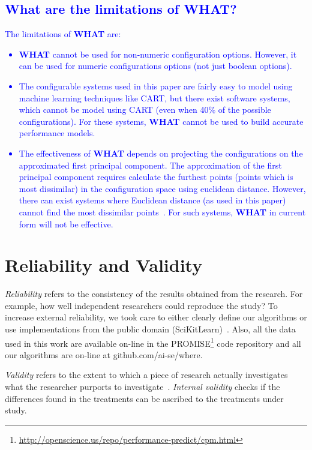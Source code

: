 \documentclass[smallextended]{svjour3}       %
\newcommand{\what}{{\bf WHAT}\xspace}
\begin{document}
\subsection{\textcolor{blue}{What are the limitations of WHAT?}}
\textcolor{blue}{
The limitations of \what{} are:
\begin{itemize}
    \item \what{} cannot be used for non-numeric configuration options. However, it can be used for numeric configurations options (not just boolean options). 
    \item The configurable systems used in this paper are fairly easy to model using machine learning techniques like CART, but there exist software systems, which cannot be model using CART (even when 40\% of the possible configurations). For these systems, \what{} cannot be used to build accurate performance models.
    \item The effectiveness of \what{} depends on projecting the configurations on the approximated first principal component. The approximation of the first principal component requires calculate the furthest points (points which is most dissimilar)  in the configuration space using euclidean distance. However, there can exist systems where  Euclidean distance (as used in this paper) cannot  find the most dissimilar points~\cite{chen2016sampling}. For such systems, \what{} in current form will not be effective.
\end{itemize}
}
\section{Reliability and Validity}\label{sect:construct}

{\em Reliability} refers to the consistency of the results obtained
from the research.  For example,   how well independent researchers
could reproduce the study? To increase external
reliability, we took care to either  clearly define our
algorithms or use implementations from the public domain
(SciKitLearn)~\cite{scikit-learn}. Also, all the data used in this work are available
on-line in the PROMISE\footnote{\url{http://openscience.us/repo/performance-predict/cpm.html}} code repository and all our algorithms
are on-line at github.com/ai-se/where.

{\em Validity} refers to the extent to which a piece of research actually
investigates what the researcher purports to investigate~\cite{SSA15}.
{\em Internal validity} checks if the differences found in
the treatments can be ascribed to the treatments under study. 
\end{document}
